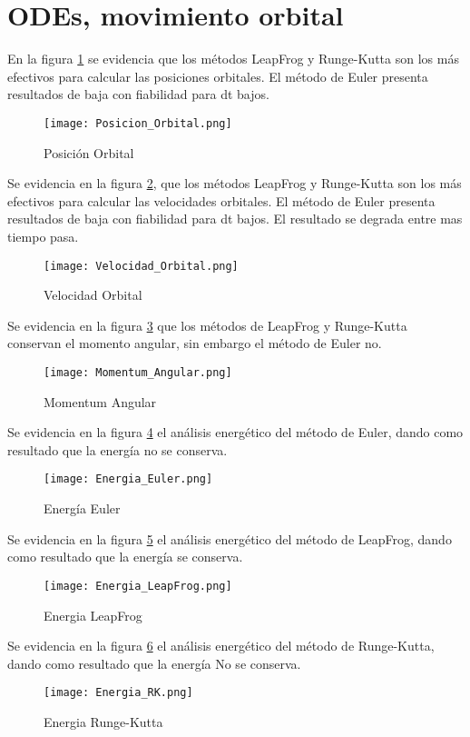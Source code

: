 \documentclass{article} %
\begin{document}
\section{ODEs, movimiento orbital}

En la figura \ref{fig:Posicion_Orbital} se evidencia que los métodos LeapFrog y Runge-Kutta son los más efectivos para calcular las posiciones orbitales. El método de Euler presenta resultados de baja con fiabilidad para dt bajos.
\begin{figure}[H]
    \centering
    \texttt{[image: Posicion\_Orbital.png]}
    \caption{Posición Orbital}
    \label{fig:Posicion_Orbital}
\end{figure}
Se evidencia en la figura \ref{fig:Velocidad_Orbital}, que los métodos LeapFrog y Runge-Kutta son los más efectivos para calcular las velocidades orbitales. El método de Euler presenta resultados de baja con fiabilidad para dt bajos. El resultado se degrada entre mas tiempo pasa.
\begin{figure}[H]
    \centering
    \texttt{[image: Velocidad\_Orbital.png]}
    \caption{Velocidad Orbital}
    \label{fig:Velocidad_Orbital}
\end{figure}
Se evidencia en la figura \ref{fig:Momentum_Angular} que los métodos de LeapFrog y Runge-Kutta conservan el momento angular, sin embargo el método de Euler no.
\begin{figure}[H]
    \centering
    \texttt{[image: Momentum\_Angular.png]}
    \caption{Momentum Angular}
    \label{fig:Momentum_Angular}
\end{figure}
Se evidencia en la figura \ref{fig:Energia_Euler} el análisis energético del método de Euler, dando como resultado que la energía no se conserva. 
\begin{figure}[H]
    \centering
    \texttt{[image: Energia\_Euler.png]}
    \caption{Energía Euler}
    \label{fig:Energia_Euler}
\end{figure}
Se evidencia en la figura \ref{fig:Energia_LeapFrog} el análisis energético del método de LeapFrog, dando como resultado que la energía se conserva. 
\begin{figure}[H]
    \centering
    \texttt{[image: Energia\_LeapFrog.png]}
    \caption{Energia LeapFrog}
    \label{fig:Energia_LeapFrog}
\end{figure}
Se evidencia en la figura \ref{fig:Energia_RK} el análisis energético del método de Runge-Kutta, dando como resultado que la energía No se conserva. 
\begin{figure}[H]
    \centering
    \texttt{[image: Energia\_RK.png]}
    \caption{Energia Runge-Kutta}
    \label{fig:Energia_RK}
\end{figure}
\end{document}
